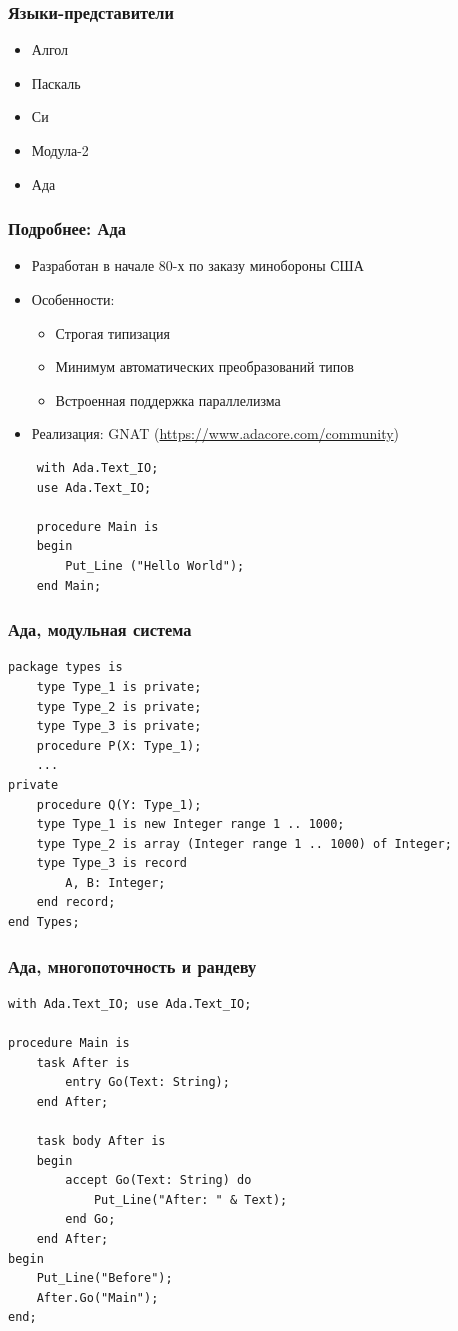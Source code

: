 \documentclass[xetex,mathserif,serif]{beamer}
\begin{document}
	\begin{frame}
		\frametitle{Языки-представители}
		\begin{itemize}
			\item Алгол
			\item Паскаль
			\item Си
			\item Модула-2
			\item Ада
		\end{itemize}
	\end{frame}

	\begin{frame}[fragile]
		\frametitle{Подробнее: Ада}
		\begin{itemize}
			\item Разработан в начале 80-х по заказу минобороны США
			\item Особенности:
			\begin{itemize}
				\item Строгая типизация
				\item Минимум автоматических преобразований типов
				\item Встроенная поддержка параллелизма
			\end{itemize}
			\item Реализация: GNAT (\url{https://www.adacore.com/community})
		\end{itemize}
		\begin{verbatim}
    with Ada.Text_IO;
    use Ada.Text_IO;

    procedure Main is
    begin
        Put_Line ("Hello World");
    end Main;
		\end{verbatim}
	\end{frame}

	\begin{frame}[fragile]
		\frametitle{Ада, модульная система}
		\begin{verbatim}
package types is
    type Type_1 is private;
    type Type_2 is private;
    type Type_3 is private;
    procedure P(X: Type_1);
    ...
private
    procedure Q(Y: Type_1);
    type Type_1 is new Integer range 1 .. 1000;
    type Type_2 is array (Integer range 1 .. 1000) of Integer;
    type Type_3 is record
        A, B: Integer;
    end record;
end Types;
		\end{verbatim}
	\end{frame}

	\begin{frame}[fragile]
		\frametitle{Ада, многопоточность и рандеву}
		\begin{small}
			\begin{verbatim}
with Ada.Text_IO; use Ada.Text_IO;

procedure Main is
    task After is
        entry Go(Text: String);
    end After;

    task body After is
    begin
        accept Go(Text: String) do
            Put_Line("After: " & Text);
        end Go;
    end After;
begin
    Put_Line("Before");
    After.Go("Main");
end;
			\end{verbatim}
		\end{small}
	\end{frame}
\end{document}

